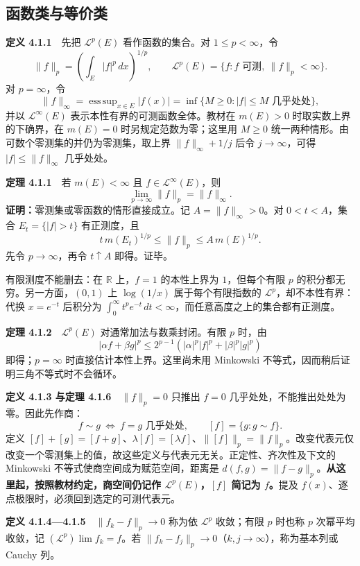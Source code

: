 \documentclass[11pt,a4paper]{article}
\begin{document}
\subsection{函数类与等价类}\label{ch04-s1-ux51fdux6570ux7c7bux4e0eux7b49ux4ef7ux7c7b}

\textbf{定义 4.1.1}　先把 \(\mathcal L^p(E)\) 看作函数的集合。对
\(1\le p<\infty\)，令 \[
\|f\|_p=\left(\int_E|f|^p\,dx\right)^{1/p},\qquad
\mathcal L^p(E)=\{f:f\text{ 可测},\ \|f\|_p<\infty\}.
\] 对 \(p=\infty\)，令 \[
\|f\|_\infty=\mathop{\mathrm{ess\,sup}}_{x\in E}|f(x)|
=\inf\{M\ge0:|f|\le M\text{ 几乎处处}\},
\] 并以 \(\mathcal L^\infty(E)\) 表示本性有界的可测函数全体。教材在
\(m(E)>0\) 时取实数上界的下确界，在 \(m(E)=0\) 时另规定范数为零；这里用
\(M\ge0\) 统一两种情形。由可数个零测集的并仍为零测集，取上界
\(\|f\|_\infty+1/j\) 后令 \(j\to\infty\)，可得 \(|f|\le\|f\|_\infty\)
几乎处处。

\textbf{定理 4.1.1}　若 \(m(E)<\infty\) 且
\(f\in\mathcal L^\infty(E)\)，则 \[
\lim_{p\to\infty}\|f\|_p=\|f\|_\infty.
\] \textbf{证明：}零测集或零函数的情形直接成立。记
\(A=\|f\|_\infty>0\)。对 \(0<t<A\)，集合 \(E_t=\{|f|>t\}\) 有正测度，且
\[
t\,m(E_t)^{1/p}\le\|f\|_p\le A\,m(E)^{1/p}.
\] 先令 \(p\to\infty\)，再令 \(t\uparrow A\) 即得。证毕。

有限测度不能删去：在 \(\mathbb R\) 上，\(f=1\) 的本性上界为
\(1\)，但每个有限 \(p\) 的积分都无穷。另一方面，\((0,1)\) 上
\(\log(1/x)\) 属于每个有限指数的 \(\mathcal L^p\)，却不本性有界：代换
\(x=e^{-t}\) 后积分为
\(\int_0^\infty t^pe^{-t}\,dt<\infty\)，而任意高度之上的集合都有正测度。

\textbf{定理 4.1.2}　\(\mathcal L^p(E)\) 对通常加法与数乘封闭。有限
\(p\) 时，由 \[
|\alpha f+\beta g|^p\le 2^{p-1}(|\alpha|^p|f|^p+|\beta|^p|g|^p)
\] 即得；\(p=\infty\) 时直接估计本性上界。这里尚未用 Minkowski
不等式，因而稍后证明三角不等式时不会循环。

\textbf{定义 4.1.3 与定理 4.1.6}　\(\|f\|_p=0\) 只推出 \(f=0\)
几乎处处，不能推出处处为零。因此先作商： \[
f\sim g\ \Longleftrightarrow\ f=g\text{ 几乎处处},\qquad
[f]=\{g:g\sim f\}.
\] 定义
\([f]+[g]=[f+g]\)、\(\lambda[f]=[\lambda f]\)、\(\|[f]\|_p=\|f\|_p\)。改变代表元仅改变一个零测集上的值，故这些定义与代表元无关。正定性、齐次性及下文的
Minkowski 不等式使商空间成为赋范空间，距离是
\(d(f,g)=\|f-g\|_p\)。\textbf{从这里起，按照教材约定，商空间仍记作
\(\mathcal L^p(E)\)，\([f]\) 简记为 \(f\)。}提及
\(f(x)\)、逐点极限时，必须回到选定的可测代表元。

\textbf{定义 4.1.4---4.1.5}　\(\|f_k-f\|_p\to0\) 称为依 \(\mathcal L^p\)
收敛；有限 \(p\) 时也称 \(p\) 次幂平均收敛，记
\((\mathcal L^p)\lim f_k=f\)。若
\(\|f_k-f_j\|_p\to0\)（\(k,j\to\infty\)），称为基本列或 Cauchy 列。
\end{document}
